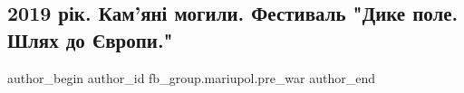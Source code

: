  
 
 
 
 

\subsection{2019 рік. Кам'яні могили. Фестиваль "Дике поле. Шлях до Європи."}
\label{sec:13_02_2023.fb.fb_group.mariupol.pre_war.4.2019_r_k__kam_yan__m}

\ifcmt
 author_begin
   author_id fb_group.mariupol.pre_war
 author_end
\fi
